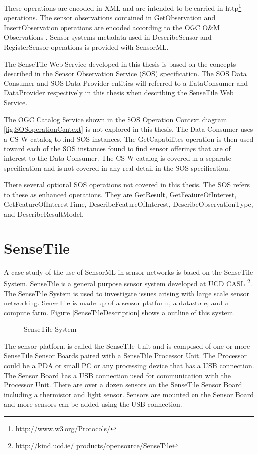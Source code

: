 \documentclass[]{final_report}
\begin{document}
These operations are encoded in XML and are intended to be carried in http\footnote{http://www.w3.org/Protocols/}  operations. The sensor observations contained in GetObservation and InsertObservation operations are encoded according to the OGC O\&M Observations \cite{OMref}. Sensor systems metadata used in DescribeSensor and RegisterSensor operations is provided with SensorML.

The SenseTile Web Service developed in this thesis is based on the concepts described in the Sensor Observation Service (SOS) specification. The SOS Data Consumer and SOS Data Provider entities will referred to a DataConsumer and DataProvider respectively in this thesis when describing the SenseTile Web Service.
 
The OGC Catalog Service shown in the SOS Operation Context diagram \ref{fig:SOSoperationContext} is not explored in this thesis. The Data Consumer uses a CS-W catalog to find SOS instances. The GetCapabilites operation is then used toward each of the SOS instances found to find sensor offerings that are of interest to the Data Consumer. The CS-W catalog is covered in a separate specification \cite{OGCcatref} and is not covered in any real detail in the SOS specification. 

There several optional SOS operations not covered in this thesis. The SOS refers to these as enhanced operations. They are GetResult, GetFeatureOfInterest, GetFeatureOfInterestTime, DescribeFeatureOfInterest, DescribeObservationType, and DescribeResultModel. 


\section{SenseTile}
A case study of the use of SensorML in sensor networks is based on the SenseTile System. SenseTile is a general purpose sensor system developed at UCD CASL \footnote{http://kind.ucd.ie/
products/opensource/SenseTile}. The SenseTile System is used to investigate issues arising with large scale sensor networking. SenseTile is made up of a sensor platform, a datastore, and a compute farm. Figure \ref{SenseTileDescription} shows a outline of this system. 
\begin{figure}[h]
\centering
{}
\caption{SenseTile System}\label{fig:SenseTileDescription}
\end{figure}
 The sensor platform is called the SenseTile Unit and is composed of one or more SenseTile Sensor Boards paired with a SenseTile Processor Unit. The Processor could be a PDA or small PC or any processing device that has a USB connection.  The Sensor Board has a USB connection used for communication with the Processor Unit. There are over a dozen sensors on the SenseTile Sensor Board including a thermistor and light sensor. Sensors are mounted on the Sensor Board and more sensors can be added using the USB connection.
\end{document}
